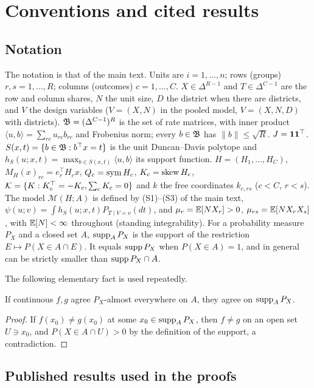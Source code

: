 \section{Conventions and cited results}\label{sec:conv}

\subsection{Notation}

The notation is that of the main text. Units are $i=1,\dots,n$; rows (groups)
$r,s=1,\dots,R$; columns (outcomes) $c=1,\dots,C$. $X\in\Delta^{R-1}$ and
$T\in\Delta^{C-1}$ are the row and column shares, $N$ the unit size, $D$ the
district when there are districts, and $V$ the design variables ($V=(X,N)$ in the
pooled model, $V=(X,N,D)$ with districts). $\mathfrak B=(\Delta^{C-1})^R$ is the set of
rate matrices, with inner product $\langle u,b\rangle=\sum_{rc}u_{rc}b_{rc}$ and
Frobenius norm; every $b\in\mathfrak B$ has $\|b\|\le\sqrt R$. $J=\mathbf 1\mathbf 1^\top$.
$S(x,t)=\{b\in\mathfrak B:b^\top x=t\}$ is the unit Duncan--Davis polytope and
$h_S(u;x,t)=\max_{b\in S(x,t)}\langle u,b\rangle$ its support function.
$H=(H_1,\dots,H_C)$, $M_H(x)_{rc}=e_r^\top H_cx$, $Q_c=\operatorname{sym} H_c$, $K_c=\operatorname{skew} H_c$,
$\mathcal K=\{K:K_c^\top=-K_c,\sum_cK_c=0\}$ and $k$ the free coordinates $k_{c,rs}$
($c<C$, $r<s$). The model $\mathcal M(H;A)$ is defined by (S1)--(S3) of the main
text, $\psi(u;v)=\int h_S(u;x,t)P_{T\mid V=v}(dt)$, and $\mu_r=\mathbb E[NX_r]>0$,
$\mu_{rs}=\mathbb E[NX_rX_s]$, with $\mathbb E[N]<\infty$ throughout (standing integrability).
For a probability measure $P_X$ and a closed set $A$, $\operatorname{supp}_AP_X$ is the support of
the restriction $E\mapsto P(X\in A\cap E)$. It equals $\operatorname{supp} P_X$ when
$P(X\in A)=1$, and in general can be strictly smaller than $\operatorname{supp} P_X\cap A$.

The following elementary fact is used repeatedly.

\begin{lemma}\label{lem:supp}
If continuous $f,g$ agree $P_X$-almost everywhere on $A$, they agree on $\operatorname{supp}_AP_X$.
\end{lemma}
\begin{proof}
If $f(x_0)\ne g(x_0)$ at some $x_0\in\operatorname{supp}_AP_X$, then $f\ne g$ on an open set
$U\ni x_0$, and $P(X\in A\cap U)>0$ by the definition of the support, a
contradiction.
\end{proof}

\subsection{Published results used in the proofs}

